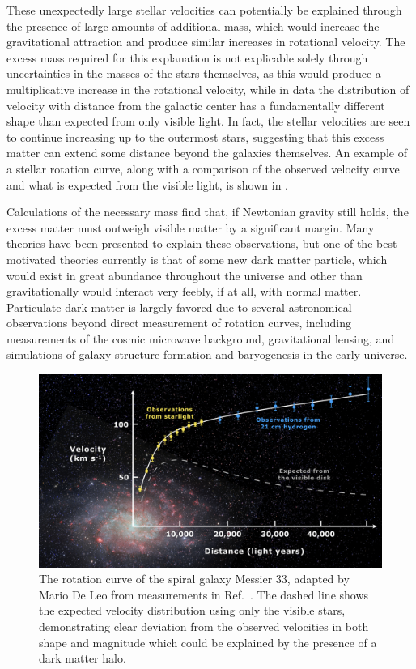 These unexpectedly large stellar velocities can potentially be explained through the presence of large amounts of additional mass, which would increase the gravitational attraction and produce similar increases in rotational velocity. 
The excess mass required for this explanation is not explicable solely through uncertainties in the masses of the stars themselves, as this would produce a multiplicative increase in the rotational velocity, while in data the distribution of velocity with distance from the galactic center has a fundamentally different shape than expected from only visible light.
In fact, the stellar velocities are seen to continue increasing up to the outermost stars, suggesting that this excess matter can extend some distance beyond the galaxies themselves. 
An example of a stellar rotation curve, along with a comparison of the observed velocity curve and what is expected from the visible light, is shown in .

Calculations of the necessary mass find that, if Newtonian gravity still holds, the excess matter must outweigh visible matter by a significant margin. 
Many theories have been presented to explain these observations, but one of the best motivated theories currently is that of some new dark matter particle, which would exist in great abundance throughout the universe and other than gravitationally would interact very feebly, if at all, with normal matter.
Particulate dark matter is largely favored due to several astronomical observations beyond direct measurement of rotation curves, including measurements of the cosmic microwave background, gravitational lensing, and simulations of galaxy structure formation and baryogenesis in the early universe.

\begin{figure}
   \centering
   \includegraphics[width=\textwidth]{figures/rotation_curve.png}
   \caption[Rotation curve of Messier 33]{The rotation curve of the spiral galaxy Messier 33, adapted by Mario De Leo from measurements in Ref.~\cite{Corbelli}. The dashed line shows the expected velocity distribution using only the visible stars, demonstrating clear deviation from the observed velocities in both shape and magnitude which could be explained by the presence of a dark matter halo.}
   \label{fig:rotCurve}	
\end{figure}


